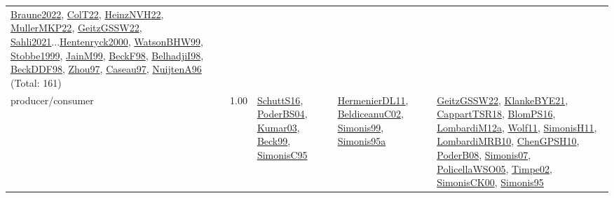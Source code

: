 {\begin{longtable}{p{3cm}r>{\raggedright\arraybackslash}p{6cm}>{\raggedright\arraybackslash}p{6cm}>{\raggedright\arraybackslash}p{8cm}}
\hyperref[detail:Braune2022]{Braune2022}, \hyperref[detail:ColT22]{ColT22}, \hyperref[detail:HeinzNVH22]{HeinzNVH22}, \hyperref[detail:MullerMKP22]{MullerMKP22}, \hyperref[detail:GeitzGSSW22]{GeitzGSSW22}, \hyperref[detail:Sahli2021]{Sahli2021}...\hyperref[detail:Hentenryck2000]{Hentenryck2000}, \hyperref[detail:WatsonBHW99]{WatsonBHW99}, \hyperref[detail:Stobbe1999]{Stobbe1999}, \hyperref[detail:JainM99]{JainM99}, \hyperref[detail:BeckF98]{BeckF98}, \hyperref[detail:BelhadjiI98]{BelhadjiI98}, \hyperref[detail:BeckDDF98]{BeckDDF98}, \hyperref[detail:Zhou97]{Zhou97}, \hyperref[detail:Caseau97]{Caseau97}, \hyperref[detail:NuijtenA96]{NuijtenA96} (Total: 161)\\
\index{producer/consumer}\index{Concepts!producer/consumer}producer/consumer &  1.00 & \hyperref[detail:SchuttS16]{SchuttS16}, \hyperref[detail:PoderBS04]{PoderBS04}, \hyperref[detail:Kumar03]{Kumar03}, \hyperref[detail:Beck99]{Beck99}, \hyperref[detail:SimonisC95]{SimonisC95} & \hyperref[detail:HermenierDL11]{HermenierDL11}, \hyperref[detail:BeldiceanuC02]{BeldiceanuC02}, \hyperref[detail:Simonis99]{Simonis99}, \hyperref[detail:Simonis95a]{Simonis95a} & \hyperref[detail:GeitzGSSW22]{GeitzGSSW22}, \hyperref[detail:KlankeBYE21]{KlankeBYE21}, \hyperref[detail:CappartTSR18]{CappartTSR18}, \hyperref[detail:BlomPS16]{BlomPS16}, \hyperref[detail:LombardiM12a]{LombardiM12a}, \hyperref[detail:Wolf11]{Wolf11}, \hyperref[detail:SimonisH11]{SimonisH11}, \hyperref[detail:LombardiMRB10]{LombardiMRB10}, \hyperref[detail:ChenGPSH10]{ChenGPSH10}, \hyperref[detail:PoderB08]{PoderB08}, \hyperref[detail:Simonis07]{Simonis07}, \hyperref[detail:PolicellaWSO05]{PolicellaWSO05}, \hyperref[detail:Timpe02]{Timpe02}, \hyperref[detail:SimonisCK00]{SimonisCK00}, \hyperref[detail:Simonis95]{Simonis95}\\

\end{longtable}}
